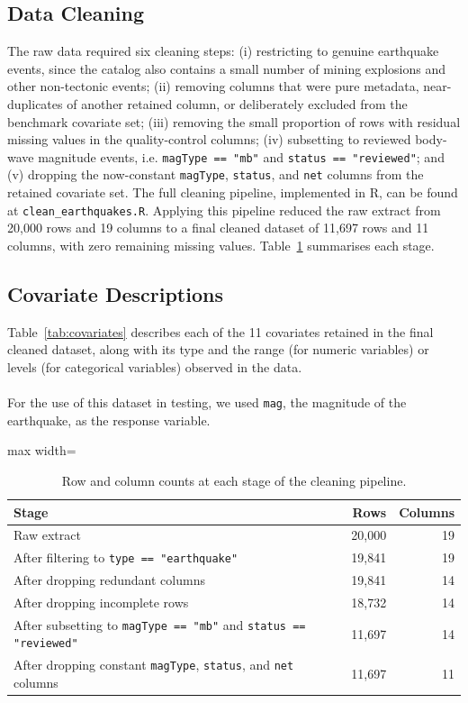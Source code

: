 \documentclass[10pt]{article}
\begin{document}
\subsection{Data Cleaning}

The raw data required six cleaning steps: (i) restricting to genuine earthquake
events, since the catalog also contains a small number of mining explosions and
other non-tectonic events; (ii) removing columns that were pure metadata,
near-duplicates of another retained column, or deliberately excluded from the
benchmark covariate set; (iii) removing the small proportion of rows with
residual missing values in the quality-control columns; (iv) subsetting to
reviewed body-wave magnitude events, i.e. \texttt{magType == "mb"} and
\texttt{status == "reviewed"}; and (v) dropping the now-constant
\texttt{magType}, \texttt{status}, and \texttt{net} columns from the retained covariate set.
The full cleaning pipeline, implemented in R, can be found at \nolinkurl{clean_earthquakes.R}\cite{repo}. Applying this pipeline reduced the raw extract from 20{,}000 rows and 19 columns
to a final cleaned dataset of 11{,}697 rows and 11 columns, with zero remaining
missing values. Table~\ref{tab:pipeline} summarises each stage.

\subsection{Covariate Descriptions}

Table~\ref{tab:covariates} describes each of the 11 covariates retained in the
final cleaned dataset, along with its type and the range (for numeric variables)
or levels (for categorical variables) observed in the data.
\\\\
For the use of this dataset in testing, we used \texttt{mag}, the magnitude of the earthquake, as the response variable.

\begin{table}[t!]
\centering
\begin{adjustbox}{max width=\textwidth}
\begin{tabular}{lrr}
\toprule
Stage & Rows & Columns \\
\midrule
Raw extract & 20{,}000 & 19 \\
After filtering to \texttt{type == "earthquake"} & 19{,}841 & 19 \\
After dropping redundant columns & 19{,}841 & 14 \\
After dropping incomplete rows & 18{,}732 & 14 \\
After subsetting to \texttt{magType == "mb"} and \texttt{status == "reviewed"} & 11{,}697 & 14 \\
After dropping constant \texttt{magType}, \texttt{status}, and \texttt{net} columns & 11{,}697 & 11 \\
\bottomrule
\end{tabular}
\end{adjustbox}
\caption{Row and column counts at each stage of the cleaning pipeline.}
\label{tab:pipeline}
\end{table}
\end{document}
